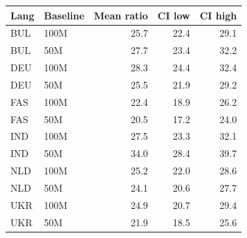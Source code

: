 \begin{tabular}{@{}llrrr@{}}
\toprule
Lang & Baseline & Mean ratio & CI low & CI high \\
\midrule
BUL & 100M & 25.7 & 22.4 & 29.1 \\
BUL & 50M & 27.7 & 23.4 & 32.2 \\
DEU & 100M & 28.3 & 24.4 & 32.4 \\
DEU & 50M & 25.5 & 21.9 & 29.2 \\
FAS & 100M & 22.4 & 18.9 & 26.2 \\
FAS & 50M & 20.5 & 17.2 & 24.0 \\
IND & 100M & 27.5 & 23.3 & 32.1 \\
IND & 50M & 34.0 & 28.4 & 39.7 \\
NLD & 100M & 25.2 & 22.0 & 28.6 \\
NLD & 50M & 24.1 & 20.6 & 27.7 \\
UKR & 100M & 24.9 & 20.7 & 29.4 \\
UKR & 50M & 21.9 & 18.5 & 25.6 \\
\bottomrule
\end{tabular}
